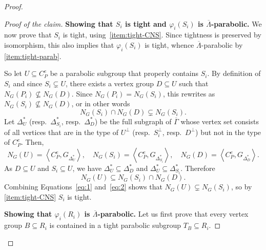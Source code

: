 \documentclass[a4paper,english,11pt]{article}
\theoremstyle{definition}
\theoremstyle{remark}
\begin{document}
\begin{proof}
\begin{proof}[Proof of the claim]
\textbf{Showing that {$S_i$ is tight and} $\varphi_i(S_i)$ is $\overline{\Lambda}$-parabolic.} We now prove that $S_i$ is tight, using~\ref{item:tight-CNS}. Since tightness is preserved by isomorphism, this also implies that $\varphi_i(S_i)$ is tight, whence $\overline{\Lambda}$-parabolic by \ref{item:tight-parab}.

So let $U\subseteq C_P^e$ be a parabolic subgroup that properly contains $S_i$. By definition of $S_i$ and since $S_i \subsetneq U$, there exists a vertex group $D\subseteq U$ such that $N_G(P_i)\not\subseteq N_G(D)$. Since $N_G(P_i)=N_G(S_i)$, this rewrites as $N_G(S_i)\not\subseteq N_G(D)$, or in other words 
\begin{equation}\label{eq:1}
    N_G(S_i)\cap N_G(D)\subsetneq N_G(S_i).
\end{equation}
Let $\Delta^*_U$ (resp.\ $\Delta^*_{S_i}$, resp.\ $\Delta^*_D$) be the full subgraph of $\overline{\Gamma}$ whose vertex set consists of all vertices that are in the type of $U^\perp$ (resp.\ $S_i^\perp$, resp.\ $D^\perp$) but not in the type of $C_P^e$. Then,
\begin{equation*}
    N_G(U)=\left\langle{C_P^e, G_{\Delta_U^*}} \right\rangle, \quad 
    N_G(S_i)=\left\langle{C_P^e, G_{\Delta_{S_i}^*}} \right\rangle, \quad 
    N_G(D)=\left\langle{C_P^e, G_{\Delta_D^*}} \right\rangle.
\end{equation*} 
As $D\subseteq U$ and $S_i\subseteq U$, we have $\Delta_U^*\subseteq \Delta_D^*$ and $\Delta_U^*\subseteq \Delta_{S_i}^*$. Therefore 
\begin{equation}\label{eq:2}
    N_G(U)\subseteq N_G(S_i)\cap N_G(D).
\end{equation}
Combining Equations~\eqref{eq:1} and~\eqref{eq:2} shows that $N_G(U)\subsetneq N_G(S_i)$, so by \ref{item:tight-CNS} $S_i$ is tight.

\medskip

\textbf{Showing that $\varphi_i(R_i)$ is $\overline{\Lambda}$-parabolic.}
Let us first prove that every vertex group $B\subseteq R_i$ is contained in a tight parabolic subgroup $T_B\subseteq R_i$.


\end{proof}
\end{proof}
\end{document}

